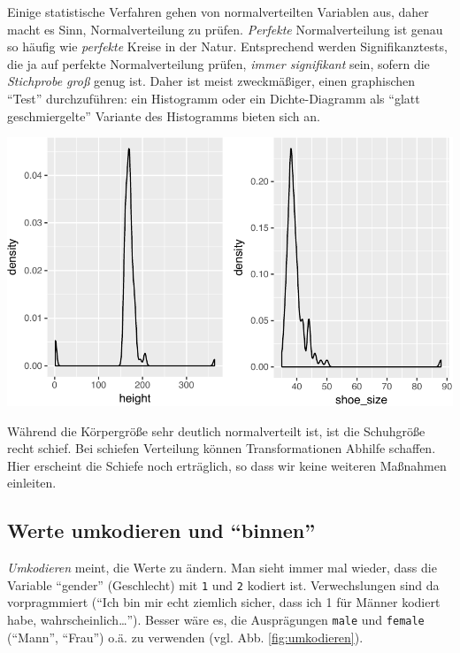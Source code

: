 \documentclass[12pt,ngerman,]{book}
\begin{document}
Einige statistische Verfahren gehen von normalverteilten Variablen aus,
daher macht es Sinn, Normalverteilung zu prüfen. \emph{Perfekte}
Normalverteilung ist genau so häufig wie \emph{perfekte} Kreise in der
Natur. Entsprechend werden Signifikanztests, die ja auf perfekte
Normalverteilung prüfen, \emph{immer signifikant} sein, sofern die
\emph{Stichprobe groß} genug ist. Daher ist meist zweckmäßiger, einen
graphischen ``Test'' durchzuführen: ein Histogramm oder ein
Dichte-Diagramm als ``glatt geschmiergelte'' Variante des Histogramms
bieten sich an.

\begin{center}\includegraphics[width=0.7\linewidth]{043_Typische_Probleme_Datenanalyse_files/figure-latex/unnamed-chunk-13-1} \end{center}

Während die Körpergröße sehr deutlich normalverteilt ist, ist die
Schuhgröße recht schief. Bei schiefen Verteilung können Transformationen
Abhilfe schaffen. Hier erscheint die Schiefe noch erträglich, so dass
wir keine weiteren Maßnahmen einleiten.

\subsection{\texorpdfstring{Werte umkodieren und
``binnen''}{Werte umkodieren und binnen}}\label{werte-umkodieren-und-binnen}

\emph{Umkodieren} meint, die Werte zu ändern. Man
sieht immer mal wieder, dass die Variable ``gender'' (Geschlecht) mit
\texttt{1} und \texttt{2} kodiert ist. Verwechslungen sind da
vorpragmmiert (``Ich bin mir echt ziemlich sicher, dass ich 1 für Männer
kodiert habe, wahrscheinlich\ldots{}''). Besser wäre es, die
Ausprägungen \texttt{male} und \texttt{female} (``Mann'', ``Frau'') o.ä.
zu verwenden (vgl. Abb. \ref{fig:umkodieren}).
\end{document}
